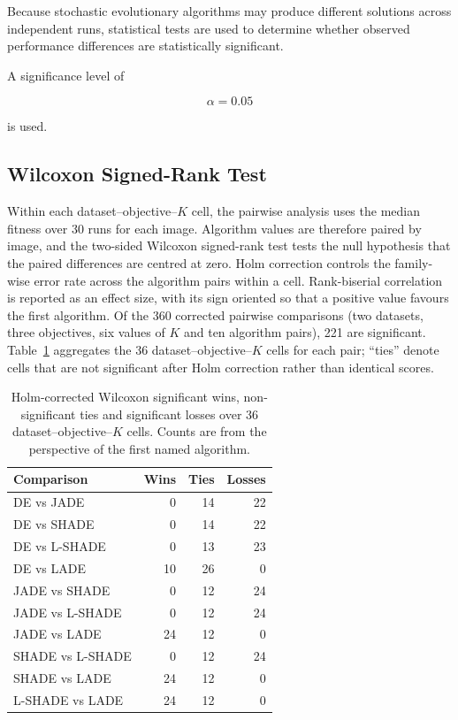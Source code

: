 \documentclass[review]{elsarticle}
\begin{document}
Because stochastic evolutionary algorithms may produce different
solutions across independent runs, statistical tests are used to
determine whether observed performance differences are statistically
significant.

A significance level of

\begin{equation}
\alpha = 0.05
\end{equation}

is used.


\subsection{Wilcoxon Signed-Rank Test}

Within each dataset--objective--$K$ cell, the pairwise analysis
uses the median fitness over 30 runs for each image. Algorithm values are
therefore paired by image, and the two-sided Wilcoxon signed-rank test
tests the null hypothesis that the paired differences are centred at
zero. Holm correction controls the family-wise error rate across the
algorithm pairs within a cell. Rank-biserial correlation is reported as
an effect size, with its sign oriented so that a positive value favours
the first algorithm. Of the 360 corrected pairwise comparisons (two
datasets, three objectives, six values of $K$ and ten algorithm pairs),
221 are significant. Table~\ref{tab:wilcoxon-summary} aggregates the 36
dataset--objective--$K$ cells for each pair; ``ties'' denote cells that
are not significant after Holm correction rather than identical scores.

\begin{table}[htbp]
\caption{Holm-corrected Wilcoxon significant wins, non-significant ties
and significant losses over 36 dataset--objective--$K$ cells. Counts are
from the perspective of the first named algorithm.}
\label{tab:wilcoxon-summary}
\centering
\begin{tabular}{lrrr}
\toprule
Comparison & Wins & Ties & Losses \\
\midrule
DE vs JADE & 0 & 14 & 22 \\
DE vs SHADE & 0 & 14 & 22 \\
DE vs L-SHADE & 0 & 13 & 23 \\
DE vs LADE & 10 & 26 & 0 \\
JADE vs SHADE & 0 & 12 & 24 \\
JADE vs L-SHADE & 0 & 12 & 24 \\
JADE vs LADE & 24 & 12 & 0 \\
SHADE vs L-SHADE & 0 & 12 & 24 \\
SHADE vs LADE & 24 & 12 & 0 \\
L-SHADE vs LADE & 24 & 12 & 0 \\
\bottomrule
\end{tabular}
\end{table}
\end{document}
